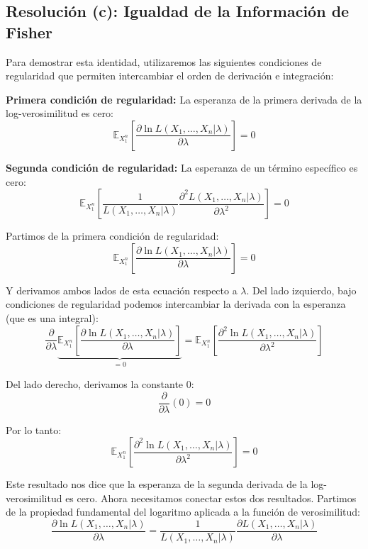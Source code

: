 \documentclass[
  11pt,
  letterpaper,
   addpoints,
   answers
  ]{exam}
\begin{document}
\begin{questions}
\begin{parts}
\begin{solution}
\subsection*{Resolución (c): Igualdad de la Información de Fisher}

Para demostrar esta identidad, utilizaremos las siguientes condiciones de regularidad que permiten intercambiar el orden de derivación e integración:

\textbf{Primera condición de regularidad:} La esperanza de la primera derivada de la log-verosimilitud es cero:
\begin{equation}
\mathbb{E}_{X_1^n}\left[\frac{\partial \ln L(X_1, \ldots, X_n|\lambda)}{\partial \lambda}\right] = 0
\end{equation}

\textbf{Segunda condición de regularidad:} La esperanza de un término específico es cero:
\begin{equation}
\mathbb{E}_{X_1^n}\left[\frac{1}{L(X_1, \ldots, X_n|\lambda)}\frac{\partial^2 L(X_1, \ldots, X_n|\lambda)}{\partial \lambda^2}\right] = 0
\end{equation}

Partimos de la primera condición de regularidad:
\[
\mathbb{E}_{X_1^n}\left[\frac{\partial \ln L(X_1, \ldots, X_n|\lambda)}{\partial \lambda}\right] = 0
\]

Y derivamos ambos lados de esta ecuación respecto a $\lambda$. Del lado izquierdo, bajo condiciones de regularidad podemos intercambiar la derivada con la esperanza (que es una integral):
\[
\frac{\partial}{\partial \lambda}\underbrace{\mathbb{E}_{X_1^n}\left[\frac{\partial \ln L(X_1, \ldots, X_n|\lambda)}{\partial \lambda}\right]}_{= 0} = \mathbb{E}_{X_1^n}\left[\frac{\partial^2 \ln L(X_1, \ldots, X_n|\lambda)}{\partial \lambda^2}\right]
\]

Del lado derecho, derivamos la constante $0$:
\[
\frac{\partial}{\partial \lambda}(0) = 0
\]

Por lo tanto:
\[
\mathbb{E}_{X_1^n}\left[\frac{\partial^2 \ln L(X_1, \ldots, X_n|\lambda)}{\partial \lambda^2}\right] = 0
\]

Este resultado nos dice que la esperanza de la segunda derivada de la log-verosimilitud es cero. Ahora necesitamos conectar estos dos resultados. Partimos de la propiedad fundamental del logaritmo aplicada a la función de verosimilitud:
\[
\frac{\partial \ln L(X_1, \ldots, X_n|\lambda)}{\partial \lambda} = \frac{1}{L(X_1, \ldots, X_n|\lambda)}\frac{\partial L(X_1, \ldots, X_n|\lambda)}{\partial \lambda}
\]


\end{solution}
\end{parts}
\end{questions}
\end{document}
